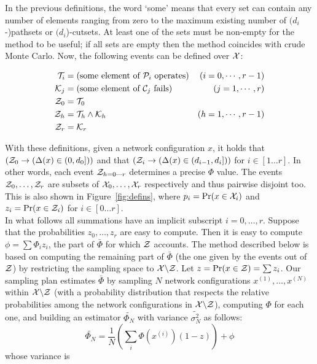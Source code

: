 \documentclass[a4paper]{article}
\begin{document}
In the previous definitions, the word `some' means that every set can contain any number of elements ranging from zero to the maximum existing number of \mbox{$(d_i$-)pathsets} or \mbox{$(d_i$)-cutsets}. At least one of the sets must be non-empty for the method to be useful; if all sets are empty then the method coincides with crude Monte Carlo. Now, the following events can be defined over $\cal X$:

\begin{align*}
{\cal T}_i& = (\text{some element of }{\cal P}_i\text{ operates}) & (i=0,\cdots,r-1) \\
{\cal K}_j& = (\text{some element of }{\cal C}_j\text{ fails}) & (j=1,\cdots,r) \\
{\cal Z}_0& = {\cal T}_0 \\
{\cal Z}_h& = {\cal T}_h \wedge {\cal K}_h & (h=1,\cdots,r-1)\\
{\cal Z}_r& = {\cal K}_r
\end{align*}

With these definitions, given a network configuration $x$, it holds that $({\cal Z}_0 \to (\Delta(x)\in (0,d_0]))$ and that $({\cal Z}_i \to (\Delta(x)\in (d_{i-1},d_i]))$ for $i\in [1\dots r]$. In other words, each event ${\cal Z}_{h=0\cdots r}$ determines a precise $\Phi$ value. The events ${\cal Z}_0,\dots,{\cal Z}_r$ are subsets of ${\cal X}_0,\dots,{\cal X}_r$ respectively and thus pairwise disjoint too. This is also shown in Figure~\ref{fig:defins}, where $p_i=\Pr(x \in {\cal X}_i)$ and $z_i=\Pr(x \in {\cal Z}_i)$ for $i\in [0\dots r]$.\\

In what follows all summations have an implicit subscript $i=0,\dots,r$. Suppose that the probabilities $z_0,\dots,z_r$ are easy to compute. Then it is easy to compute $\phi=\sum\Phi_iz_i$,  the part of $\bar\Phi$ for which ${\cal Z}$ accounts. The method described below is based on computing the remaining part of $\bar\Phi$ (the one given by the events out of ${\cal Z}$) by restricting the sampling space to ${\cal X}{\setminus}{\cal Z}$. Let $z=\Pr(x\in {\cal Z})=\sum z_i$. Our sampling plan estimates $\bar{\Phi}$ by sampling $N$ network configurations $x^{(1)},\dots,x^{(N)}$ within ${\cal X}{\setminus}{\cal Z}$ (with a probability distribution that respects the relative probabilities among the network configurations in ${\cal X}{\setminus}{\cal Z}$), computing $\Phi$ for each one, and building an estimator $\widetilde{\Phi_N}$ with variance $\widetilde{\sigma^2_N}$ as follows:
\begin{equation*} \widetilde{\Phi_N} = \frac{1}{N}\left(\sum_i\Phi(x^{(i)})(1-z)\right)+\phi \end{equation*}
whose variance is
\end{document}
